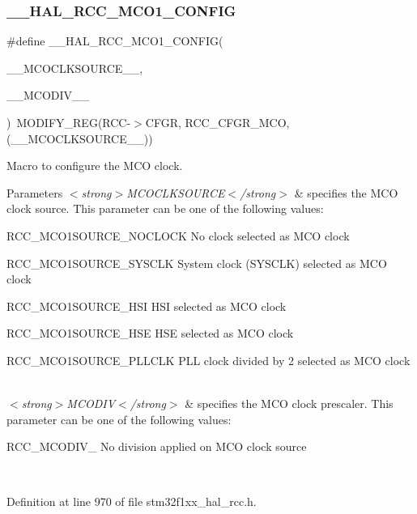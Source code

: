 \subsubsection{\texorpdfstring{\+\_\+\+\_\+\+H\+A\+L\+\_\+\+R\+C\+C\+\_\+\+M\+C\+O1\+\_\+\+C\+O\+N\+F\+IG}{\_\_HAL\_RCC\_MCO1\_CONFIG}}
{\footnotesize\ttfamily \#define \+\_\+\+\_\+\+H\+A\+L\+\_\+\+R\+C\+C\+\_\+\+M\+C\+O1\+\_\+\+C\+O\+N\+F\+IG(\begin{DoxyParamCaption}\item[{}]{\+\_\+\+\_\+\+M\+C\+O\+C\+L\+K\+S\+O\+U\+R\+C\+E\+\_\+\+\_\+,  }\item[{}]{\+\_\+\+\_\+\+M\+C\+O\+D\+I\+V\+\_\+\+\_\+ }\end{DoxyParamCaption})~M\+O\+D\+I\+F\+Y\+\_\+\+R\+EG(R\+CC-\/$>$C\+F\+GR, R\+C\+C\+\_\+\+C\+F\+G\+R\+\_\+\+M\+CO, (\+\_\+\+\_\+\+M\+C\+O\+C\+L\+K\+S\+O\+U\+R\+C\+E\+\_\+\+\_\+))}



Macro to configure the M\+CO clock. 


\begin{DoxyParams}{Parameters}
{\em $<$strong$>$\+M\+C\+O\+C\+L\+K\+S\+O\+U\+R\+C\+E$<$/strong$>$} & specifies the M\+CO clock source. This parameter can be one of the following values\+: \begin{DoxyItemize}
\item R\+C\+C\+\_\+\+M\+C\+O1\+S\+O\+U\+R\+C\+E\+\_\+\+N\+O\+C\+L\+O\+CK No clock selected as M\+CO clock \item R\+C\+C\+\_\+\+M\+C\+O1\+S\+O\+U\+R\+C\+E\+\_\+\+S\+Y\+S\+C\+LK System clock (S\+Y\+S\+C\+LK) selected as M\+CO clock \item R\+C\+C\+\_\+\+M\+C\+O1\+S\+O\+U\+R\+C\+E\+\_\+\+H\+SI H\+SI selected as M\+CO clock \item R\+C\+C\+\_\+\+M\+C\+O1\+S\+O\+U\+R\+C\+E\+\_\+\+H\+SE H\+SE selected as M\+CO clock \item R\+C\+C\+\_\+\+M\+C\+O1\+S\+O\+U\+R\+C\+E\+\_\+\+P\+L\+L\+C\+LK P\+LL clock divided by 2 selected as M\+CO clock \end{DoxyItemize}
\\
\hline
{\em $<$strong$>$\+M\+C\+O\+D\+I\+V$<$/strong$>$} & specifies the M\+CO clock prescaler. This parameter can be one of the following values\+: \begin{DoxyItemize}
\item R\+C\+C\+\_\+\+M\+C\+O\+D\+I\+V\+\_ No division applied on M\+CO clock source \end{DoxyItemize}
\\
\hline
\end{DoxyParams}


Definition at line 970 of file stm32f1xx\+\_\+hal\+\_\+rcc.\+h.

